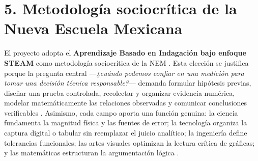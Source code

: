 \documentclass[spanish,letterpaper,oneside]{article}
\begin{document}
\section{5. Metodología sociocrítica de la Nueva Escuela Mexicana}
El proyecto adopta el \textbf{Aprendizaje Basado en Indagación bajo enfoque STEAM} como metodología sociocrítica de la NEM \citep{sep2022plan}. Esta elección se justifica porque la pregunta central —\textit{¿cuándo podemos confiar en una medición para tomar una decisión técnica responsable?}— demanda formular hipótesis previas, diseñar una prueba controlada, recolectar y organizar evidencia numérica, modelar matemáticamente las relaciones observadas y comunicar conclusiones verificables \citep{quiroga2022aprendizaje}. Asimismo, cada campo aporta una función genuina: la ciencia fundamenta la magnitud física y las fuentes de error; la tecnología organiza la captura digital o tabular sin reemplazar el juicio analítico; la ingeniería define tolerancias funcionales; las artes visuales optimizan la lectura crítica de gráficas; y las matemáticas estructuran la argumentación lógica \citep{rivas2017innovaciones}.
\end{document}
